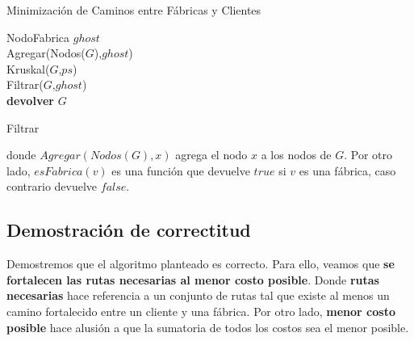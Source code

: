 \begin{algorithm}[H]
	\SetAlgoLined
	\caption{Minimización de Caminos entre Fábricas y Clientes}
	NodoFabrica $ghost$\\
	Agregar(Nodos($G$),$ghost$)\\
	Kruskal($G$,$ps$) \\
	Filtrar($G$,$ghost$) \\
	\textbf{devolver} $G$	
\end{algorithm}

\begin{algorithm}[H]
	\SetAlgoLined
	\caption{Filtrar}
\end{algorithm}

donde $Agregar(Nodos(G),x)$ agrega el nodo $x$ a los nodos de $G$. Por otro lado, $esFabrica(v)$ es una función que devuelve $true$ si $v$ es una fábrica, caso contrario devuelve $false$.

\subsection{Demostración de correctitud}

Demostremos que el algoritmo planteado es correcto. Para ello, veamos que \textbf{se fortalecen las rutas necesarias al menor costo posible}. Donde \textbf{rutas necesarias} hace referencia a un conjunto de rutas tal que existe al menos un camino fortalecido entre un cliente y una fábrica. Por otro lado, \textbf{menor costo posible} hace alusión a que la sumatoria de todos los costos sea el menor posible.\newline

